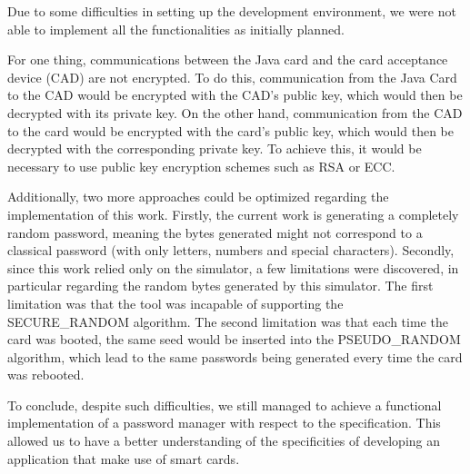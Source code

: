 \documentclass[a4paper, 11pt]{article}
\begin{document}
    Due to some difficulties in setting up the development environment, we were not able to implement all the
    functionalities as initially planned.

    For one thing, communications between the Java card and the card acceptance device (CAD) are not encrypted.
    To do this, communication from the Java Card to the CAD would be encrypted with the CAD's public key, which would
    then be decrypted with its private key.
    On the other hand, communication from the CAD to the card would be encrypted with the card's public key, which would
    then be decrypted with the corresponding private key.
    To achieve this, it would be necessary to use public key encryption schemes such as RSA or ECC\@.

    Additionally, two more approaches could be optimized regarding the implementation of this work. Firstly, the current work is 
    generating a completely random password, meaning the bytes generated might not correspond to a classical 
    password (with only letters, numbers and special characters).
    Secondly, since this work relied only on the simulator, a few limitations were discovered, in particular 
    regarding the random bytes generated by this simulator. The first limitation was that the tool was incapable of 
    supporting the SECURE_RANDOM algorithm. The second limitation was that each time the card was booted, the same seed would be 
    inserted into the PSEUDO_RANDOM algorithm, which lead to the same passwords being generated every time the card was rebooted.

    To conclude, despite such difficulties, we still managed to achieve a functional implementation of a password
    manager with respect to the specification.
    This allowed us to have a better understanding of the specificities of developing an application that make use of
    smart cards.

    \pagebreak

    
    
\end{document}
